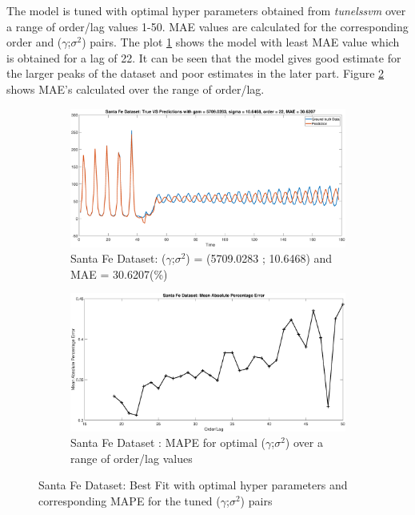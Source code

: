  The model is tuned with optimal hyper parameters obtained from \textit{tunelssvm} over a range of order/lag values 1-50. MAE values are calculated for the corresponding order and ($\gamma$;$\sigma^2$) pairs. The plot \ref{fig:sfe2} shows the model with least MAE value which is obtained for a lag of 22. It can be seen that the model gives good estimate for the larger peaks of the dataset and poor estimates in the later part. Figure \ref{fig:sfe3} shows MAE's calculated over the range of order/lag. 
 \begin{figure}[!ht] 
 	\begin{subfigure}{.5\textwidth}
 		\centering
 		\captionsetup{width=0.8\linewidth}
 		\includegraphics[height=.5\linewidth, width=0.85\linewidth]{Exercise2/Report/sfe2}
 		\caption{Santa Fe Dataset: ($\gamma$;$\sigma^2$) = (5709.0283 ; 10.6468) and MAE = 30.6207(\%)}
 		\label{fig:sfe2}
 	\end{subfigure}%
 	\begin{subfigure}{.5\textwidth}
 		\centering
 		\captionsetup{width=0.8\linewidth}
 		\includegraphics[height=.5\linewidth, width=0.85\linewidth]{Exercise2/Report/sfe3}
 		\caption{Santa Fe Dataset : MAPE for optimal ($\gamma$;$\sigma^2$) over a range of order/lag values}
 		\label{fig:sfe3}
 	\end{subfigure}
 	\caption{Santa Fe Dataset: Best Fit with optimal hyper parameters and corresponding MAPE for the tuned ($\gamma$;$\sigma^2$) pairs}
 	\label{fig:sfe}
 \end{figure}